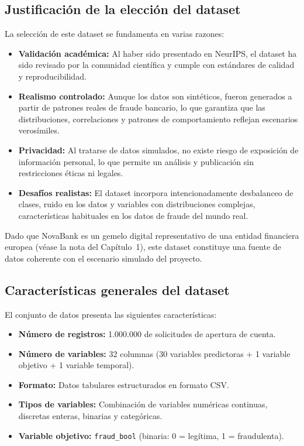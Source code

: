 \documentclass[12pt,a4paper]{report}
\begin{document}
\subsection*{Justificación de la elección del dataset}
La selección de este dataset se fundamenta en varias razones:

\begin{itemize}
    \item \textbf{Validación académica:} Al haber sido presentado en NeurIPS, el dataset ha sido revisado por la comunidad científica y cumple con estándares de calidad y reproducibilidad.
    \item \textbf{Realismo controlado:} Aunque los datos son sintéticos, fueron generados a partir de patrones reales de fraude bancario, lo que garantiza que las distribuciones, correlaciones y patrones de comportamiento reflejan escenarios verosímiles.
    \item \textbf{Privacidad:} Al tratarse de datos simulados, no existe riesgo de exposición de información personal, lo que permite un análisis y publicación sin restricciones éticas ni legales.
    \item \textbf{Desafíos realistas:} El dataset incorpora intencionadamente desbalanceo de clases, ruido en los datos y variables con distribuciones complejas, características habituales en los datos de fraude del mundo real.
\end{itemize}

Dado que NovaBank es un gemelo digital representativo de una entidad financiera europea (véase la nota del Capítulo~1), este dataset constituye una fuente de datos coherente con el escenario simulado del proyecto.

\subsection*{Características generales del dataset}
El conjunto de datos presenta las siguientes características:

\begin{itemize}
    \item \textbf{Número de registros:} 1.000.000 de solicitudes de apertura de cuenta.
    \item \textbf{Número de variables:} 32 columnas (30 variables predictoras + 1 variable objetivo + 1 variable temporal).
    \item \textbf{Formato:} Datos tabulares estructurados en formato CSV.
    \item \textbf{Tipos de variables:} Combinación de variables numéricas continuas, discretas enteras, binarias y categóricas.
    \item \textbf{Variable objetivo:} \texttt{fraud\_bool} (binaria: 0 = legítima, 1 = fraudulenta).
\end{itemize}
\end{document}

